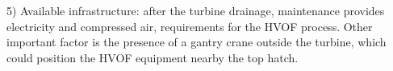 
5) Available infrastructure: after the turbine drainage, maintenance provides
electricity and compressed air, requirements for the HVOF process. Other important factor is the presence
of a gantry crane outside the turbine, which could position the HVOF equipment
nearby the top hatch. %





